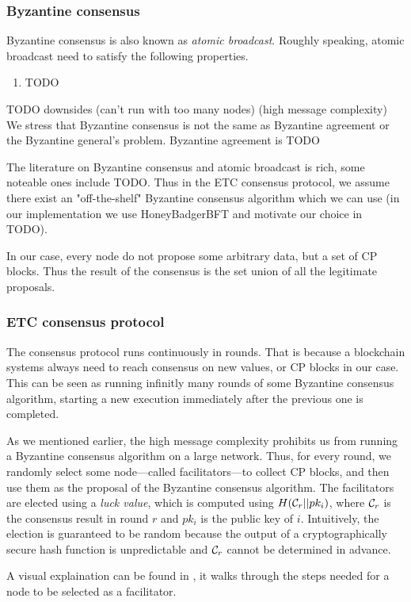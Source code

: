 \subsubsection*{Byzantine consensus}
Byzantine consensus is also known as \emph{atomic broadcast}.
Roughly speaking, atomic broadcast need to satisfy the following properties.
\begin{enumerate}
\item TODO
\end{enumerate}
TODO downsides (can't run with too many nodes) (high message complexity)
We stress that Byzantine consensus is not the same as Byzantine agreement or the Byzantine general's problem.
Byzantine agreement is TODO

The literature on Byzantine consensus and atomic broadcast is rich, some noteable ones include TODO.
Thus in the ETC consensus protocol, we assume there exist an "off-the-shelf" Byzantine consensus algorithm which we can use
(in our implementation we use HoneyBadgerBFT and motivate our choice in TODO).

In our case, every node do not propose some arbitrary data, but a set of CP blocks.
Thus the result of the consensus is the set union of all the legitimate proposals.

\subsubsection*{ETC consensus protocol} 
The consensus protocol runs continuously in rounds.
That is because a blockchain systems always need to reach consensus on new values, or CP blocks in our case.
This can be seen as running infinitly many rounds of some Byzantine consensus algorithm,
starting a new execution immediately after the previous one is completed.

As we mentioned earlier, the high message complexity prohibits us from running a Byzantine consensus algorithm on a large network.
Thus, for every round, we randomly select some node---called facilitators---to collect CP blocks,
and then use them as the proposal of the Byzantine consensus algorithm.
The facilitators are elected using a \emph{luck value}, which is computed using $H(\mathcal{C}_r || pk_i)$,
where $\mathcal{C}_r$ is the consensus result in round $r$ and $pk_i$ is the public key of $i$.
Intuitively, the election is guaranteed to be random 
because the output of a cryptographically secure hash function is unpredictable and $\mathcal{C}_r$ cannot be determined in advance.

A visual explaination can be found in ,
it walks through the steps needed for a node to be selected as a facilitator.

